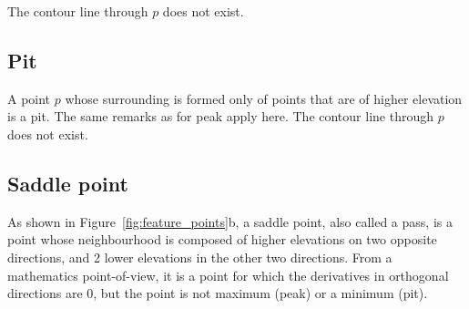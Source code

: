 The contour line through $p$ does not exist.

\subsection{Pit}
A point $p$ whose surrounding is formed only of points that are of higher elevation is a pit.
The same remarks as for peak apply here.
The contour line through $p$ does not exist.

\subsection{Saddle point}%

As shown in Figure~\ref{fig:feature_points}b, a saddle point, also called a pass, is a point whose neighbourhood is composed of higher elevations on two opposite directions, and 2 lower elevations in the other two directions.
From a mathematics point-of-view, it is a point for which the derivatives in orthogonal directions are 0, but the point is not maximum (peak) or a minimum (pit).

%

